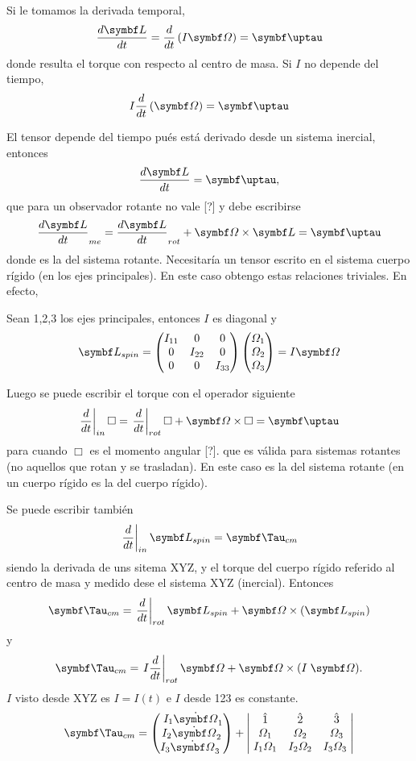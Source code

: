 \documentclass[10pt,oneside]{CBFT_book}
\begin{document}
Si le tomamos la derivada temporal,
\[
	\dtot{\vb{L}}{t} = \dtot{}{t}\left( I \vb{\Omega} \right) = \vb{\uptau}
\]
donde resulta el torque con respecto al centro de masa. Si $I$ no depende del tiempo,
\[
	I \dtot{}{t}\left( \vb{\Omega} \right) = \vb{\uptau}
\]

El tensor depende del tiempo pués está derivado desde un sistema inercial, entonces 
\[
	\dtot{\vb{L}}{t} = \vb{\uptau},
\]
que para un observador rotante no vale [?] y debe escribirse 
\[
	\dtot{\vb{L}}{t}_{me} = \dtot{\vb{L}}{t}_{rot} + \vb{\Omega} \times \vb{L} = \vb{\uptau}
\]
donde \vb{\Omega} es la del sistema rotante.
Necesitaría un tensor escrito en el sistema cuerpo rígido (en los ejes principales). En este caso obtengo estas relaciones
triviales. En efecto,

Sean 1,2,3 los ejes principales, entonces $I$ es diagonal y
\[
	\vb{L}_{spin}
	=
	\begin{pmatrix}
		I_{11} & 0 & 0 \\
		0 & I_{22} & 0 \\ 
		0 & 0 & I_{33}  \\
	\end{pmatrix}
	\begin{pmatrix}
		\Omega_1 \\
		\Omega_2 \\ 
		\Omega_3  \\
	\end{pmatrix}
	=
	I \vb{\Omega}
\]

Luego se puede escribir el torque con el operador siguiente 
\[
	\left.\frac{d}{dt}\right|_{in} \Box = \left.\frac{d}{dt}\right|_{rot} \Box + \vb{\Omega} \times \Box 
	= \vb{\uptau}
\]
para cuando $\Box$ es el momento angular [?].
que es válida para sistemas rotantes (no aquellos que rotan y se trasladan).
En este caso \vb{\Omega} es la del sistema rotante (en un cuerpo rígido es la \vb{\Omega} del cuerpo rígido).

Se puede escribir también 
\[
	\left.\frac{d}{dt}\right|_{in} \vb{L}_{spin} = \vb{\Tau}_{cm}
\]
siendo la derivada de uns sitema XYZ, y \vb{\Tau} el torque del cuerpo rígido referido al centro de masa y
medido dese el sistema XYZ (inercial).
Entonces
\[
	\vb{\Tau}_{cm} = \left. \frac{d}{dt}\right|_{rot} \vb{L}_{spin} + \vb{\Omega} \times ( \vb{L}_{spin} )
\]
y
\[
	\vb{\Tau}_{cm} = \left. I \frac{d}{dt}\right|_{rot} \vb{\Omega} + \vb{\Omega} \times ( I \; \vb{\Omega} ).
\]
$I$ visto desde XYZ es $I=I(t)$ e $I$ desde 123 es constante.
\[
	\vb{\Tau}_{cm} =
	\begin{pmatrix} \;
		I_1 \dot{\vb{\Omega}}_1 \\
		I_2 \dot{\vb{\Omega}}_2 \\ 
		I_3 \dot{\vb{\Omega}}_3 \; \\
	\end{pmatrix}
	+
	\begin{vmatrix} \;
		\hat{1} & \hat{2} & \hat{3} \\
		\; \Omega_1 & \Omega_2 & \Omega_3 \\ 
		\; I_1\Omega_1 & I_2\Omega_2 & I_3\Omega_3 \; \\
	\end{vmatrix}	
\]
\end{document}
